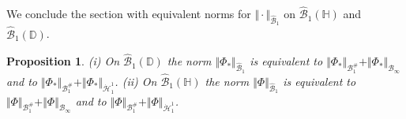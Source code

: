 \documentclass[amstex,12pt,reqno]{amsart}
\newtheorem{proposition}[theorem]{Proposition}
\theoremstyle{definition}
\begin{document}
We conclude the section with equivalent norms for $\Vert \cdot \Vert_{\widehat{\mathcal B}_1}$ on ${\widehat{\mathcal B}_1}(\mathbb H)$ and ${\widehat{\mathcal B}_1}(\mathbb D)$.

\begin{proposition}\label{H1}
{\rm (i)} On $\widehat{\mathcal B}_1(\mathbb D)$ the norm $\Vert \Phi_* \Vert_{\widehat{\mathcal B}_1}$ is equivalent to
$\Vert \Phi_* \Vert_{{\mathcal B}_1^{\#}}
+\Vert \Phi_* \Vert_{{\mathcal B}_\infty}$ and to
$\Vert \Phi_* \Vert_{{\mathcal B}^{\#}_1}+\Vert \Phi_* \Vert_{\dot {\mathcal H}_1^1}$.
{\rm (ii)} On $\widehat{\mathcal B}_1(\mathbb H)$ the norm $\Vert \Phi \Vert_{\widehat{\mathcal B}_1}$ is equivalent to
$\Vert \Phi \Vert_{{\mathcal B}_1^{\#}}
+\Vert \Phi \Vert_{{\mathcal B}_\infty}$ and to
$\Vert \Phi \Vert_{{\mathcal B}_1^{\#}}+\Vert \Phi \Vert_{\dot {\mathcal H}_1^1}$.
\end{proposition}
\end{document}
